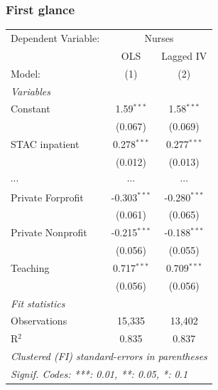 \documentclass[10pt,mathserif,aspectratio=169]{beamer}
\begin{document}
\begin{frame}
  \frametitle{First glance}
  \begin{table}
    \fontsize{8pt}{8pt}\selectfont
    \begingroup
    \centering
    \begin{tabular}{lcc}
      \tabularnewline \midrule \midrule
      Dependent Variable: & \multicolumn{2}{c}{Nurses}                         \\
                          & OLS                        & Lagged IV             \\
      Model:              & (1)                        & (2)                   \\
      \midrule
      \emph{Variables}                                                         \\
      Constant            & 1.59$^{***}$               & 1.58$^{***}$          \\
                          & (0.067)                    & (0.069)               \\
      STAC inpatient      & 0.278$^{***}$              & 0.277$^{***}$         \\
                          & (0.012)                    & (0.013)               \\
      $\cdots$            & $\cdots$                   & $\cdots$              \\
      Private Forprofit   & -0.303$^{***}$             & -0.280$^{***}$        \\
                          & (0.061)                    & (0.065)               \\
      Private Nonprofit   & -0.215$^{***}$             & -0.188$^{***}$        \\
                          & (0.056)                    & (0.055)               \\
      Teaching            & 0.717$^{***}$              & 0.709$^{***}$         \\
                          & (0.056)                    & (0.056)               \\
      \midrule
      \emph{Fit statistics}                                                    \\
      Observations        & 15,335                     & 13,402                \\
      R$^2$               & 0.835                      & 0.837                 \\
      \midrule \midrule
      \multicolumn{3}{l}{\emph{Clustered (FI) standard-errors in parentheses}} \\
      \multicolumn{3}{l}{\emph{Signif. Codes: ***: 0.01, **: 0.05, *: 0.1}}    \\
    \end{tabular}
    \par\endgroup
  \end{table}
\end{frame}
\end{document}
